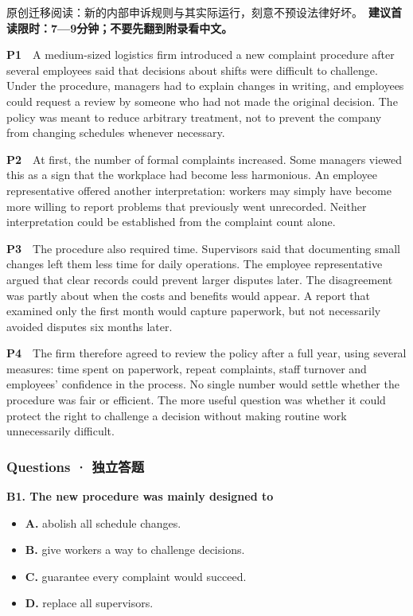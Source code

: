 \documentclass[
  11pt,
]{ctexart}
\begin{document}
原创迁移阅读：新的内部申诉规则与其实际运行，刻意不预设法律好坏。　\textbf{建议首读限时：7---9分钟；不要先翻到附录看中文。}

\textbf{P1}　A medium-sized logistics firm introduced a new complaint
procedure after several employees said that decisions about shifts were
difficult to challenge. Under the procedure, managers had to explain
changes in writing, and employees could request a review by someone who
had not made the original decision. The policy was meant to reduce
arbitrary treatment, not to prevent the company from changing schedules
whenever necessary.

\textbf{P2}　At first, the number of formal complaints increased. Some
managers viewed this as a sign that the workplace had become less
harmonious. An employee representative offered another interpretation:
workers may simply have become more willing to report problems that
previously went unrecorded. Neither interpretation could be established
from the complaint count alone.

\textbf{P3}　The procedure also required time. Supervisors said that
documenting small changes left them less time for daily operations. The
employee representative argued that clear records could prevent larger
disputes later. The disagreement was partly about when the costs and
benefits would appear. A report that examined only the first month would
capture paperwork, but not necessarily avoided disputes six months
later.

\textbf{P4}　The firm therefore agreed to review the policy after a full
year, using several measures: time spent on paperwork, repeat
complaints, staff turnover and employees' confidence in the process. No
single number would settle whether the procedure was fair or efficient.
The more useful question was whether it could protect the right to
challenge a decision without making routine work unnecessarily
difficult.

\subsubsection{Questions ·
独立答题}\label{questions-ux72ecux7acbux7b54ux9898-1}

\textbf{B1. The new procedure was mainly designed to}

\begin{itemize}
\item
  \textbf{A.} abolish all schedule changes.
\item
  \textbf{B.} give workers a way to challenge decisions.
\item
  \textbf{C.} guarantee every complaint would succeed.
\item
  \textbf{D.} replace all supervisors.
\end{itemize}
\end{document}

